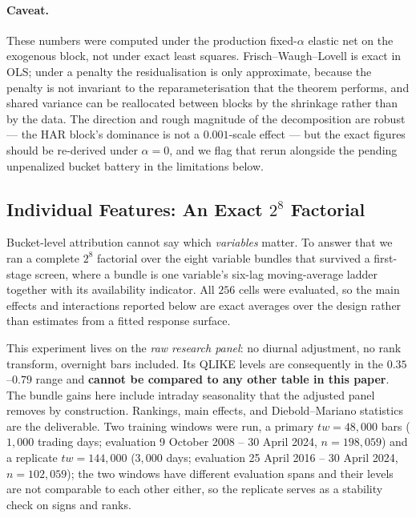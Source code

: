 \paragraph{Caveat.} These numbers were computed under the production fixed-$\alpha$ elastic
net on the exogenous block, not under exact least squares. Frisch--Waugh--Lovell is exact
in OLS; under a penalty the residualisation is only approximate, because the penalty is not
invariant to the reparameterisation that the theorem performs, and shared variance can be
reallocated between blocks by the shrinkage rather than by the data. The direction and
rough magnitude of the decomposition are robust --- the HAR block's dominance is not a
$0.001$-scale effect --- but the exact figures should be re-derived under $\alpha = 0$, and
we flag that rerun alongside the pending unpenalized bucket battery in the limitations
below.

\subsection{Individual Features: An Exact $2^8$ Factorial}

Bucket-level attribution cannot say which \emph{variables} matter. To answer that we ran a
complete $2^8$ factorial over the eight variable bundles that survived a first-stage
screen, where a bundle is one variable's six-lag moving-average ladder together with its
availability indicator. All $256$ cells were evaluated, so the main effects and
interactions reported below are exact averages over the design rather than estimates from a
fitted response surface.

This experiment lives on the \emph{raw research panel}: no diurnal adjustment, no rank
transform, overnight bars included. Its QLIKE levels are consequently in the
$0.35$--$0.79$ range and \textbf{cannot be compared to any other table in this paper}. The
bundle gains here include intraday seasonality that the adjusted panel removes by
construction. Rankings, main effects, and Diebold--Mariano statistics are the deliverable.
Two training windows were run, a primary $tw = 48{,}000$ bars ($1{,}000$ trading days;
evaluation 9 October 2008 -- 30 April 2024, $n = 198{,}059$) and a replicate
$tw = 144{,}000$ ($3{,}000$ days; evaluation 25 April 2016 -- 30 April 2024,
$n = 102{,}059$); the two windows have different evaluation spans and their levels are not
comparable to each other either, so the replicate serves as a stability check on signs and
ranks.

